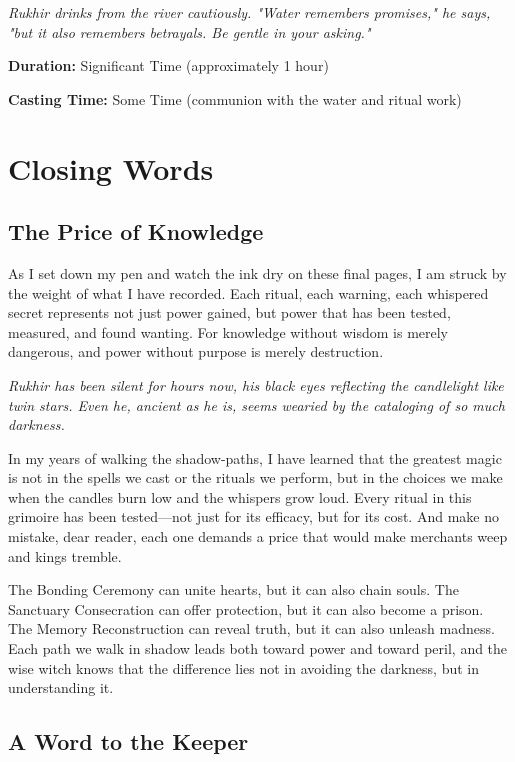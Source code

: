 \documentclass[12pt,twoside]{book}
\newcommand{\shadow}[1]{\textit{#1}}
\begin{document}
\shadow{Rukhir drinks from the river cautiously. "Water remembers promises," he says, "but it also remembers betrayals. Be gentle in your asking."}

\textbf{Duration:} Significant Time (approximately 1 hour)

\textbf{Casting Time:} Some Time (communion with the water and ritual work)

\chapter{Closing Words}

\section*{The Price of Knowledge}

\lettrine[lines=3]{A}{}s I set down my pen and watch the ink dry on these final pages, I am struck by the weight of what I have recorded. Each ritual, each warning, each whispered secret represents not just power gained, but power that has been tested, measured, and found wanting. For knowledge without wisdom is merely dangerous, and power without purpose is merely destruction.

\shadow{Rukhir has been silent for hours now, his black eyes reflecting the candlelight like twin stars. Even he, ancient as he is, seems wearied by the cataloging of so much darkness.}

In my years of walking the shadow-paths, I have learned that the greatest magic is not in the spells we cast or the rituals we perform, but in the choices we make when the candles burn low and the whispers grow loud. Every ritual in this grimoire has been tested—not just for its efficacy, but for its cost. And make no mistake, dear reader, each one demands a price that would make merchants weep and kings tremble.

The Bonding Ceremony can unite hearts, but it can also chain souls. The Sanctuary Consecration can offer protection, but it can also become a prison. The Memory Reconstruction can reveal truth, but it can also unleash madness. Each path we walk in shadow leads both toward power and toward peril, and the wise witch knows that the difference lies not in avoiding the darkness, but in understanding it.

\section*{A Word to the Keeper}
\end{document}
